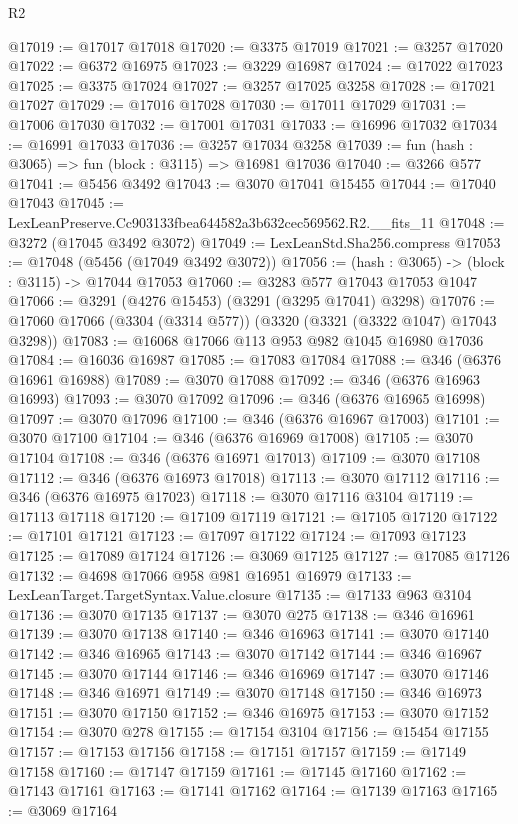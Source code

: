 \begin{lexlean}{R2}
\begin{coremodule}
@17019 := @17017 @17018
@17020 := @3375 @17019
@17021 := @3257 @17020
@17022 := @6372 @16975
@17023 := @3229 @16987
@17024 := @17022 @17023
@17025 := @3375 @17024
@17027 := @3257 @17025 @3258
@17028 := @17021 @17027
@17029 := @17016 @17028
@17030 := @17011 @17029
@17031 := @17006 @17030
@17032 := @17001 @17031
@17033 := @16996 @17032
@17034 := @16991 @17033
@17036 := @3257 @17034 @3258
@17039 := fun (hash : @3065) => fun (block : @3115) => @16981 @17036
@17040 := @3266 @577
@17041 := @5456 @3492
@17043 := @3070 @17041 @15455
@17044 := @17040 @17043
@17045 := LexLeanPreserve.Cc903133fbea644582a3b632cec569562.R2.__fits_11
@17048 := @3272 (@17045 @3492 @3072)
@17049 := LexLeanStd.Sha256.compress
@17053 := @17048 (@5456 (@17049 @3492 @3072))
@17056 := (hash : @3065) -> (block : @3115) -> @17044 @17053
@17060 := @3283 @577 @17043 @17053 @1047
@17066 := @3291 (@4276 @15453) (@3291 (@3295 @17041) @3298)
@17076 := @17060 @17066 (@3304 (@3314 @577)) (@3320 (@3321 (@3322 @1047) @17043 @3298))
@17083 := @16068 @17066 @113 @953 @982 @1045 @16980 @17036
@17084 := @16036 @16987
@17085 := @17083 @17084
@17088 := @346 (@6376 @16961 @16988)
@17089 := @3070 @17088
@17092 := @346 (@6376 @16963 @16993)
@17093 := @3070 @17092
@17096 := @346 (@6376 @16965 @16998)
@17097 := @3070 @17096
@17100 := @346 (@6376 @16967 @17003)
@17101 := @3070 @17100
@17104 := @346 (@6376 @16969 @17008)
@17105 := @3070 @17104
@17108 := @346 (@6376 @16971 @17013)
@17109 := @3070 @17108
@17112 := @346 (@6376 @16973 @17018)
@17113 := @3070 @17112
@17116 := @346 (@6376 @16975 @17023)
@17118 := @3070 @17116 @3104
@17119 := @17113 @17118
@17120 := @17109 @17119
@17121 := @17105 @17120
@17122 := @17101 @17121
@17123 := @17097 @17122
@17124 := @17093 @17123
@17125 := @17089 @17124
@17126 := @3069 @17125
@17127 := @17085 @17126
@17132 := @4698 @17066 @958 @981 @16951 @16979
@17133 := LexLeanTarget.TargetSyntax.Value.closure
@17135 := @17133 @963 @3104
@17136 := @3070 @17135
@17137 := @3070 @275
@17138 := @346 @16961
@17139 := @3070 @17138
@17140 := @346 @16963
@17141 := @3070 @17140
@17142 := @346 @16965
@17143 := @3070 @17142
@17144 := @346 @16967
@17145 := @3070 @17144
@17146 := @346 @16969
@17147 := @3070 @17146
@17148 := @346 @16971
@17149 := @3070 @17148
@17150 := @346 @16973
@17151 := @3070 @17150
@17152 := @346 @16975
@17153 := @3070 @17152
@17154 := @3070 @278
@17155 := @17154 @3104
@17156 := @15454 @17155
@17157 := @17153 @17156
@17158 := @17151 @17157
@17159 := @17149 @17158
@17160 := @17147 @17159
@17161 := @17145 @17160
@17162 := @17143 @17161
@17163 := @17141 @17162
@17164 := @17139 @17163
@17165 := @3069 @17164

\end{coremodule}
\end{lexlean}
